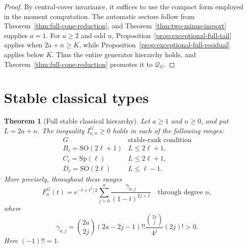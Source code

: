 \documentclass[11pt,reqno]{amsart}
\theoremstyle{plain}
\newtheorem{theorem}{Theorem}[section]
\theoremstyle{definition}
\newcommand{\Qcone}{\mathcal Q}
\begin{document}
\begin{proof}
By central-cover invariance, it suffices to use the compact form employed in
the moment computation.  The automatic sectors follow from
Theorem~\ref{thm:full-cone-reduction}, and
Theorem~\ref{thm:two-minus-import} supplies $a=1$.  For
$a\geq2$ and odd $n$, Proposition~\ref{prop:exceptional-full-tail} applies
when $2a+n\geq K$, while
Proposition~\ref{prop:exceptional-full-residual} applies below $K$.  Thus the
entire generator hierarchy holds, and
Theorem~\ref{thm:full-cone-reduction} promotes it to $\Qcone_G$.
\end{proof}

\section{Stable classical types}

\begin{theorem}[Full stable classical hierarchy]
\label{thm:stable-bcd-full}
Let $a\geq1$ and $n\geq0$, and put $L=2a+n$.  The inequality
$I^G_{a,n}\geq0$ holds in each of the following ranges:
\[
 \begin{array}{c|c}
 G&\text{stable-rank condition}\\
 \hline
 B_\ell=\mathrm{SO}(2\ell+1)&L\leq2\ell+1,\\
 C_\ell=\mathrm{Sp}(\ell)&L\leq2\ell+1,\\
 D_\ell=\mathrm{SO}(2\ell)&L\leq\ell-1.
 \end{array}
\]
More precisely, throughout these ranges
\[
 F_a^G(t)=e^{-t+t^2/2}
 \sum_{j=0}^{a}\frac{\gamma_{a,j}}{(1-t)^{2j+1}}
 \quad\text{through degree }n,
\]
where
\[
 \gamma_{a,j}
 =\binom{2a}{2j}(2a-2j-1)!!
   \frac{\binom{2j}{j}}{4^j}(2j)!>0.
\]
Here $(-1)!!=1$.
\end{theorem}
\end{document}
